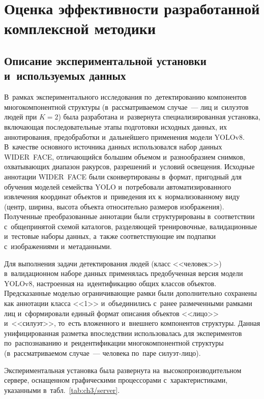 \chapter{Оценка эффективности разработанной комплексной методики}\label{ch:ch3}

\section{Описание экспериментальной установки и~используемых данных}\label{sec:ch3/setup}

В~рамках экспериментального исследования по~детектированию компонентов многокомпонентной структуры (в~рассматриваемом случае~--- лиц и~силуэтов людей при $K=2$) была разработана и~развернута специализированная установка,
включающая последовательные этапы подготовки исходных данных, их
аннотирования, предобработки и~дальнейшего применения модели YOLOv8.
В~качестве основного источника данных использовался набор данных
WIDER~FACE, отличающийся большим объемом и~разнообразием снимков,
охватывающих диапазон ракурсов, разрешений и~условий освещения.
Исходные аннотации WIDER~FACE были сконвертированы в~формат, пригодный
для обучения моделей семейства YOLO и~потребовали
автоматизированного извлечения координат объектов и~приведения их
к~нормализованному виду (центр, ширина, высота объекта относительно
размеров изображения). Полученные преобразованные аннотации были
структурированы в~соответствии с~общепринятой схемой каталогов,
разделяющей тренировочные, валидационные и~тестовые наборы данных,
а~также соответствующие им подпапки с~изображениями и~метаданными.

Для выполнения задачи детектирования людей (класс <<человек>>)
в~валидационном наборе данных применялась предобученная версия
модели YOLOv8, настроенная на~идентификацию общих классов объектов.
Предсказанные моделью ограничивающие рамки были дополнительно
сохранены как аннотации класса <<1>> и~объединились с~ранее
размеченными рамками лиц и~сформировали единый формат описания
объектов <<лицо>> и~<<силуэт>>, то~есть вложенного и~внешнего компонентов структуры. Данная унифицированная разметка
впоследствии использовалась для экспериментов по~распознаванию
и~реидентификации многокомпонентной структуры (в~рассматриваемом случае~--- человека по~паре силуэт-лицо).

Экспериментальная установка была развернута на~высокопроизводительном
сервере, оснащенном графическими процессорами
с~характеристиками, указанными в~табл.~\ref{tab:ch3/server}.

